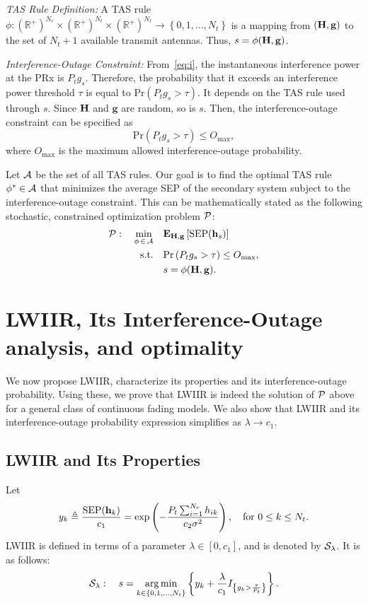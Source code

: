 \documentclass[12pt,draftcls,peerreview,onecolumn]{IEEEtran}
\newcommand{\brac}[1]{\left({#1}\right)}
\newcommand{\cbrac}[1]{\left\{{#1}\right\}}
\newcommand{\indic}[1]{I_{\cbrac{#1}}}
\newcommand{\define}{\triangleq}
\newcommand{\tendsto}{\to}
\newcommand{\mtx}[1]{{\bf #1}} %
\newcommand{\explow}[2]{{\bf{E}}_{#1}\left[{#2}\right]}
\newcommand{\prob}[1]{\text{Pr}\brac{#1}}
\DeclareMathOperator*{\argmin}{arg\,min}
\newcommand{\SEP}{\text{SEP}}
\newcommand{\nx}{{0}}
\newcommand{\lam}{\lambda}
\newcommand{\Nt}{{N_t}}
\newcommand{\Nr}{{N_r}}
\newcommand{\Pt}{{P_t}}
\newcommand{\such}{h}
\newcommand{\puch}{g}
\newcommand{\hk}[1]{{\such_{#1}}}
\newcommand{\gk}[1]{{\puch_{#1}}}
\newcommand{\g}{\mathbf{\puch}}
\newcommand{\noisevar}{\sigma^2}
\newcommand{\outmax}{O_{\text{max}}}
\newcommand{\itau}{\tau}
\newcommand{\cone}{c_{1}}
\newcommand{\ctwo}{c_{2}}
\newcommand{\taubypt}{\frac{\itau}{\Pt}}
\newcommand{\gkgrtaubypt}[1]{{\gk{#1}}>\taubypt}
\newcommand{\gindic}[1]{\indic{\gkgrtaubypt{#1}}}
\newcommand{\lambym}{\frac{\lam}{\cone}}
\newcommand{\yk}[1]{y_{#1}}
\newcommand{\ykplusgk}[1]{ \yk{#1} + \lambym\gindic{#1}}
\newcommand{\allopts}{\left\{\nx,1,\ldots,\Nt\right\}}
\newcommand{\asrule}{\phi}
\newcommand{\asspan}{{\cal A}}
\newcommand{\Hmx}{\mtx{H}}
\newcommand{\optproblem}{{\cal P}}
\newcommand{\callamrule}{{\cal S_{{\lam}}}}
\begin{document}
{\em TAS Rule Definition:} A TAS rule $\asrule:\brac{\mathbb{R}^{+}}^{\Nr}\times\brac{\mathbb{R}^{+}}^{\Nt} \times \brac{\mathbb{R}^{+}}^{\Nt} \rightarrow \allopts$ is a mapping from $\left(\Hmx,\g\right)$ to the set of $\Nt+1$ available transmit antennas. Thus, $s = \phi(\Hmx,\g)$.

{\em Interference-Outage Constraint:}
From~\eqref{eq:i}, the instantaneous interference power at the PRx is $\Pt\gk{s}$. Therefore, the probability that it exceeds an interference power threshold $\itau$ is equal to $\prob{\Pt\gk{s}>\itau}$. It depends on the TAS rule used through $s$. Since $\Hmx$ and $\g$ are random, so is $s$. Then, the interference-outage constraint can be specified as 
\begin{equation}
\prob{\Pt\gk{s}>\itau} \leq \outmax,
\label{eq:iop_cons}
\end{equation}
where $\outmax$ is the maximum allowed interference-outage probability. 


Let $\asspan$ be the set of all TAS rules. Our goal is to find the optimal TAS rule $\phi^{*}\in\asspan$ that minimizes the average SEP of the secondary system subject to the interference-outage constraint. This can be mathematically stated as the  following stochastic, constrained optimization problem $\optproblem$:
\begin{align}
\label{eq:objective}
\optproblem: \quad \min_{\asrule\,\in\,\asspan} \quad
&\explow{\Hmx,\g}{\SEP(\hs)} \\
\label{eq:cons}
\text{s.t.} \quad &\prob{\Pt\gk{s}>\itau} \leq \outmax, \\
 &s = \phi(\Hmx,\g). 
\end{align}



\section{LWIIR, Its Interference-Outage analysis, and optimality}
\label{sec:analysis}
%
We now propose LWIIR, characterize its properties and its interference-outage probability. Using these, we prove that LWIIR is indeed the solution of  $\optproblem$ above for a general class of continuous fading models. We also show that LWIIR and its interference-outage probability expression simplifies as $\lam\tendsto\cone$. 


\subsection{LWIIR and Its Properties}
\label{sec:lambda_rule}
Let 
\begin{equation}
\yk{k} \define \frac{\SEP(\bhk{k})}{\cone} = \exp\left({- \frac{\Pt\sum_{i=1}^{\Nr}\hk{ik}}{\ctwo\noisevar} }\right), \quad \text{for}\,\,  0\leq k \leq\Nt.
\label{eq:yi_def}
\end{equation}
LWIIR is defined in terms of a parameter $\lam \in \left[0, \cone\right]$, and is denoted by $\callamrule$. It is as follows:
\begin{equation}
\callamrule: \quad s=\argmin\limits_{k\in\allopts} \left\{ \ykplusgk{k} \right\}.
\label{eq:lam_weight_rule}
\end{equation}
\end{document}
